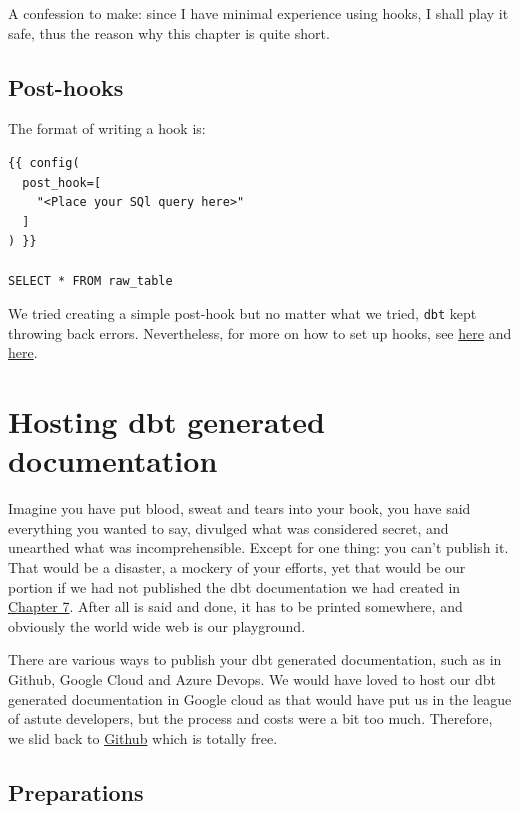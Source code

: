 \documentclass[
]{book}
\begin{document}
A confession to make: since I have minimal experience using hooks, I shall play it safe, thus the reason why this chapter is quite short.

\hypertarget{post-hooks}{%
\section{Post-hooks}\label{post-hooks}}

The format of writing a hook is:

\begin{verbatim}
{{ config(
  post_hook=[
    "<Place your SQl query here>"
  ]
) }}

SELECT * FROM raw_table
\end{verbatim}

We tried creating a simple post-hook but no matter what we tried, \texttt{dbt} kept throwing back errors. Nevertheless, for more on how to set up hooks, see \href{https://docs.getdbt.com/docs/build/hooks-operations}{here} and \href{https://www.y42.com/docs/dbt-models/hooks}{here}.

\hypertarget{hosting-dbt-generated-documentation}{%
\chapter{Hosting dbt generated documentation}\label{hosting-dbt-generated-documentation}}

Imagine you have put blood, sweat and tears into your book, you have said everything you wanted to say, divulged what was considered secret, and unearthed what was incomprehensible. Except for one thing: you can't publish it. That would be a disaster, a mockery of your efforts, yet that would be our portion if we had not published the dbt documentation we had created in \protect\hyperlink{documentation}{Chapter 7}. After all is said and done, it has to be printed somewhere, and obviously the world wide web is our playground.

There are various ways to publish your dbt generated documentation, such as in Github, Google Cloud and Azure Devops. We would have loved to host our dbt generated documentation in Google cloud as that would have put us in the league of astute developers, but the process and costs were a bit too much. Therefore, we slid back to \href{https://medium.com/dbt-local-taiwan/host-dbt-documentation-site-with-github-pages-in-5-minutes-7b80e8b62feb}{Github} which is totally free.

\hypertarget{preparations}{%
\section{Preparations}\label{preparations}}
\end{document}
